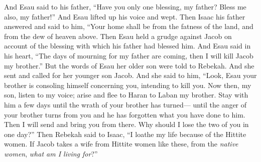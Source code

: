 \begin{biblechapter}
\verse And Esau said to his father, “Have you only one blessing, my father? Bless me also, my father!” And Esau lifted up his voice and wept.
\verse Then Isaac his father answered and said to him,
\verse “Your home shall be from the fatness of the land, 
and from the dew of heaven above.
\verse Then Esau held a grudge against Jacob on account of the blessing with which his father had blessed him. And Esau said in his heart, “The days of mourning for my father are coming, then I will kill Jacob my brother.”
\verse But the words of Esau her older son were told to Rebekah. And she sent and called for her younger son Jacob. And she said to him, “Look, Esau your brother is consoling himself concerning you, intending to kill you.
\verse Now then, my son, listen to my voice; arise and flee to Haran to Laban my brother.
\verse Stay with him a few days until the wrath of your brother has turned—
\verse until the anger of your brother turns from you and he has forgotten what you have done to him. Then I will send and bring you from there. Why should I lose the two of you in one day?”
\verse Then Rebekah said to Isaac, “I loathe my life because of the Hittite women. If Jacob takes a wife from Hittite women like these, from the \textit{native women}, \textit{what am I living for}?”
\end{biblechapter}

